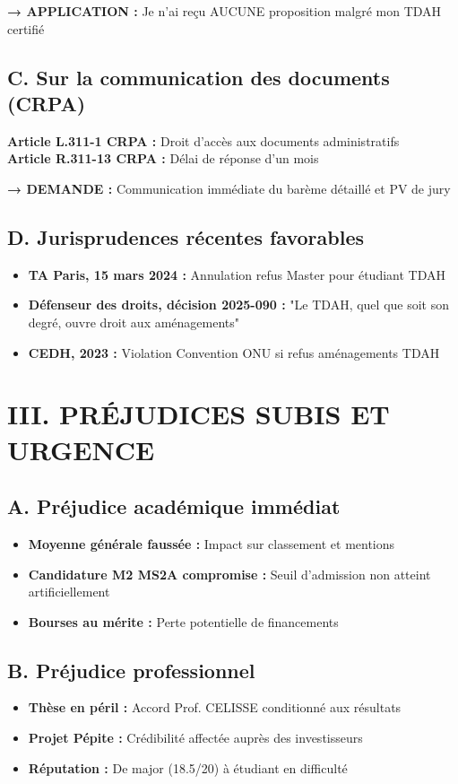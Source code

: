 \documentclass[12pt,french]{scrlttr2}
\begin{document}
\begin{letter}
\textbf{→ APPLICATION :} Je n'ai reçu AUCUNE proposition malgré mon TDAH certifié

\subsection*{C. Sur la communication des documents (CRPA)}

\textbf{Article L.311-1 CRPA :} Droit d'accès aux documents administratifs\\
\textbf{Article R.311-13 CRPA :} Délai de réponse d'un mois

\textbf{→ DEMANDE :} Communication immédiate du barème détaillé et PV de jury

\subsection*{D. Jurisprudences récentes favorables}

\begin{itemize}[leftmargin=*]
\item \textbf{TA Paris, 15 mars 2024 :} Annulation refus Master pour étudiant TDAH
\item \textbf{Défenseur des droits, décision 2025-090 :} "Le TDAH, quel que soit son degré, ouvre droit aux aménagements"
\item \textbf{CEDH, 2023 :} Violation Convention ONU si refus aménagements TDAH
\end{itemize}

\section*{III. PRÉJUDICES SUBIS ET URGENCE}

\subsection*{A. Préjudice académique immédiat}
\begin{itemize}[leftmargin=*]
\item \textbf{Moyenne générale faussée :} Impact sur classement et mentions
\item \textbf{Candidature M2 MS2A compromise :} Seuil d'admission non atteint artificiellement
\item \textbf{Bourses au mérite :} Perte potentielle de financements
\end{itemize}

\subsection*{B. Préjudice professionnel}
\begin{itemize}[leftmargin=*]
\item \textbf{Thèse en péril :} Accord Prof. CELISSE conditionné aux résultats
\item \textbf{Projet Pépite :} Crédibilité affectée auprès des investisseurs
\item \textbf{Réputation :} De major (18.5/20) à étudiant en difficulté
\end{itemize}


\end{letter}
\end{document}
